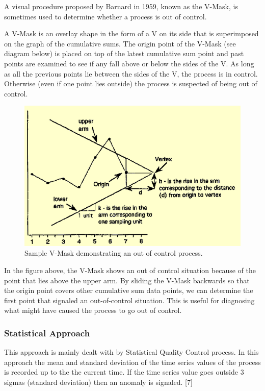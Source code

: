 \documentclass[12pt,a4paper]{report}
\begin{document}
A visual procedure proposed by Barnard in 1959, known as the V-Mask, is sometimes used to determine whether a process is out of control. 


A V-Mask is an overlay shape in the form of a V on its side that is superimposed on the graph of the cumulative sums. The origin point of the V-Mask (see diagram below) is placed on top of the latest cumulative sum point and past points are examined to see if any fall above or below the sides of the V. As long as all the previous points lie between the sides of the V, the process is in control. Otherwise (even if one point lies outside) the process is suspected of being out of control.


\begin{figure}[h!]
	\centering
		\includegraphics[scale=0.6]{screenshots/vmask.png}
		\caption{Sample V-Mask demonstrating an out of control process.}
\end{figure}


In the figure above, the V-Mask shows an out of control situation because of the point that lies above the upper arm. By sliding the V-Mask backwards so that the origin point covers other cumulative sum data points, we can determine the first point that signaled an out-of-control situation. This is useful for diagnosing what might have caused the process to go out of control.
\subsubsection{Statistical Approach}
This approach is mainly dealt with by Statistical Quality Control process. In this approach the mean and standard deviation of the time series values of the process is recorded up to the the current time. If the time series value goes outside 3 sigmas (standard deviation) then an anomaly is signaled. [7]
\end{document}
